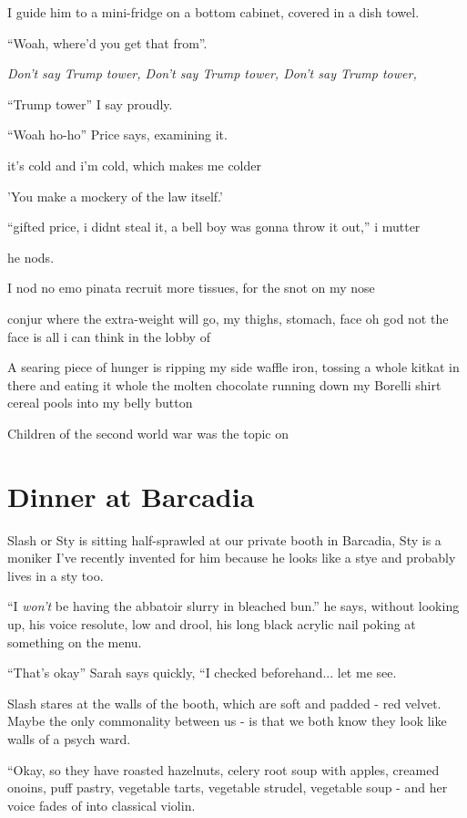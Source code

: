 \documentclass[19pt,openany]{book}
\begin{document}
I guide him to a mini-fridge
on a bottom cabinet,
covered in a dish towel.

``Woah, where'd you get that from''.

\textit{Don't say Trump tower,
Don't say Trump tower,
Don't say Trump tower,}

``Trump tower'' I say proudly.

``Woah ho-ho'' Price says, examining it.

it's cold and i'm cold, which makes me colder

'You make a mockery of the law itself.'

``gifted price, i didnt steal it,
a bell boy was gonna throw it out,''
i mutter

he nods.

I nod no
 emo pinata
recruit more tissues,
for the snot on my nose

conjur where the extra-weight
will go, my thighs, stomach,
face oh god not the face
is all i can think in the lobby
of

A searing piece of hunger
is ripping my side
waffle iron,
tossing a whole kitkat
in there and eating it
whole the molten chocolate
running down my Borelli
shirt
cereal pools into my belly
button

Children of the second world
war was the topic on

\chapter{Dinner at Barcadia}
Slash or Sty is sitting half-sprawled at our private
booth in Barcadia, Sty is a moniker I've recently
invented for him because he looks like a stye and probably
lives in a sty too.

``I \textit{won't} be having the
abbatoir slurry in bleached bun.'' he says,
without looking up, his voice resolute, low and
drool, his long black acrylic nail poking
at something on the menu.

``That's okay'' Sarah says quickly, ``I checked
beforehand... let me see.

Slash stares at the walls of the booth, which are soft
and padded - red velvet. Maybe the only commonality between
us - is that we both know they look like walls of a psych
ward.

``Okay, so they have roasted hazelnuts, celery root soup with
apples, creamed onoins, puff pastry, vegetable tarts, vegetable
strudel, vegetable soup - and her voice fades of into classical violin.
\end{document}
